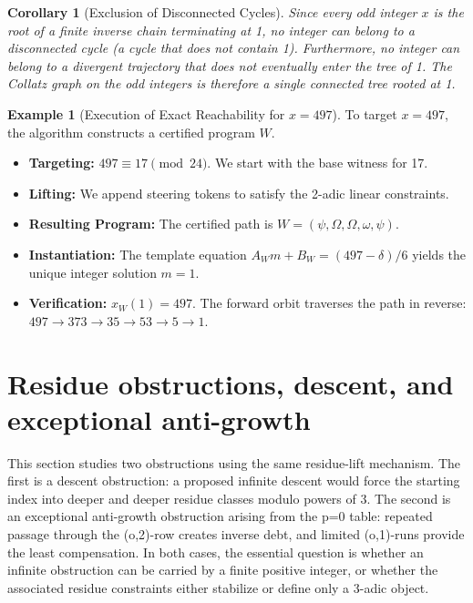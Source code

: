 \documentclass[11pt,letterpaper]{amsart}
\def\({}%
\def\){}%
\theoremstyle{definition}
\newtheorem{example}{Example}
\theoremstyle{plain}
\theoremstyle{plain}
\newtheorem{corollary}[theorem]{Corollary}
\theoremstyle{remark}
\begin{document}
\begin{corollary}[Exclusion of Disconnected Cycles]
\label{cor:no-disconnected-cycles}
Since every odd integer $x$ is the root of a finite inverse chain terminating at 1, no integer can belong to a disconnected cycle (a cycle that does not contain 1). Furthermore, no integer can belong to a divergent trajectory that does not eventually enter the tree of 1. The Collatz graph on the odd integers is therefore a single connected tree rooted at 1.
\end{corollary}

\begin{example}[Execution of Exact Reachability for $x=497$]
To target $x=497$, the algorithm constructs a certified program $W$.
\begin{itemize}
    \item \textbf{Targeting:} $497 \equiv 17 \pmod{24}$. We start with the base witness for 17.
    \item \textbf{Lifting:} We append steering tokens to satisfy the 2-adic linear constraints.
    \item \textbf{Resulting Program:} The certified path is $W = (\psi, \Omega, \Omega, \omega, \psi)$.
    \item \textbf{Instantiation:} The template equation $A_W m + B_W = (497-\delta)/6$ yields the unique integer solution $m=1$.
    \item \textbf{Verification:} $x_W(1) = 497$. The forward orbit traverses the path in reverse: $497 \to 373 \to 35 \to 53 \to 5 \to 1$.
\end{itemize}
\end{example}

\section{Residue obstructions, descent, and exceptional anti-growth}
\label{sec:residue-obstructions-descent-antigrowth}

This section studies two obstructions using the same residue-lift
mechanism.  The first is a descent obstruction: a proposed infinite
descent would force the starting index into deeper and deeper residue
classes modulo powers of \(3\).  The second is an exceptional anti-growth
obstruction arising from the \(p=0\) table: repeated passage through the
\((o,2)\)-row creates inverse debt, and limited \((o,1)\)-runs provide
the least compensation.  In both cases, the essential question is whether
an infinite obstruction can be carried by a finite positive integer, or
whether the associated residue constraints either stabilize or define
only a \(3\)-adic object.
\end{document}
